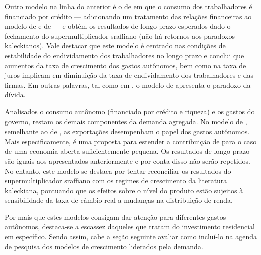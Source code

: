 Outro modelo na linha do anterior é o de \textcite{mandarino_financing_2018} em que o consumo dos trabalhadores é financiado por crédito --- adicionando um tratamento das relações financeiras ao modelo de \textcite{pariboni_household_2016} e de \textcite{fagundes_dinamica_2017} --- e obtém os resultados de longo prazo esperados dado o fechamento do supermultiplicador sraffiano (não há retornos aos paradoxos kaleckianos).
Vale destacar que este modelo é centrado nas condições de estabilidade do endividamento dos trabalhadores no longo prazo e conclui que aumentos da taxa de crescimento dos gastos autônomos, bem como na taxa de juros implicam em diminuição da taxa de endividamento dos trabalhadores e das firmas. 
Em outras palavras, tal como em \textcite{hein_autonomous_2018}, o modelo de \textcite{mandarino_financing_2018} apresenta o paradoxo da dívida.


Analisados o consumo autônomo (financiado por crédito e riqueza) e os gastos do governo, restam os demais componentes da demanda agregada.
No modelo de \textcite{nah_long-run_2017}, semelhante ao de \textcite{dejuan_hidden_2017}, as exportações desempenham o papel dos gastos autônomos. Mais especificamente, é uma proposta para estender a contribuição de \textcite{serrano_sraffian_1995} para o caso de uma economia aberta suficientemente pequena. Os resultados de longo prazo são iguais aos apresentados anteriormente e por conta disso não serão repetidos. No entanto, este modelo se destaca por tentar reconciliar os resultados do supermultiplicador sraffiano com os regimes de crescimento da literatura kaleckiana, pontuando que os efeitos sobre o nível do produto estão sujeitos à sensibilidade da taxa de câmbio real a mudanças na distribuição de renda. 


Por mais que estes modelos consigam dar atenção para diferentes gastos autônomos, destaca-se a escassez daqueles que tratam do investimento residencial em específico. 
Sendo assim, cabe a seção seguinte avaliar como incluí-lo na agenda de pesquisa dos modelos de crescimento liderados pela demanda.
